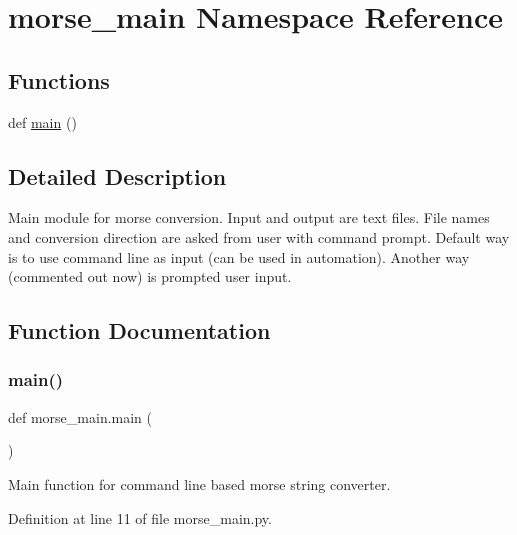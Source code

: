 \hypertarget{namespacemorse__main}{}\section{morse\+\_\+main Namespace Reference}
\label{namespacemorse__main}
\subsection*{Functions}
\begin{DoxyCompactItemize}
\item 
def \mbox{\hyperlink{namespacemorse__main_a76d936650259b2059dd69cfe7a501ff8}{main}} ()
\end{DoxyCompactItemize}


\subsection{Detailed Description}
\begin{DoxyVerb}Main module for morse conversion. Input and output are text files.
   File names and conversion direction are asked from user with command prompt.
   Default way is to use command line as input (can be used in automation).
   Another way (commented out now) is prompted user input.
\end{DoxyVerb}
 

\subsection{Function Documentation}
\mbox{\label{namespacemorse__main_a76d936650259b2059dd69cfe7a501ff8}} 
\subsubsection{\texorpdfstring{main()}{main()}}
{\footnotesize\ttfamily def morse\+\_\+main.\+main (\begin{DoxyParamCaption}{ }\end{DoxyParamCaption})}

\begin{DoxyVerb}Main function for command line based morse string converter.
\end{DoxyVerb}
 

Definition at line 11 of file morse\+\_\+main.\+py.



